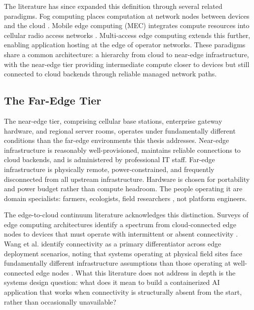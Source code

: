 The literature has since expanded this definition through several related paradigms. Fog computing places computation at network nodes between devices and the cloud \cite{bonomi2012fog, shi2016edge}. Mobile edge computing (MEC) integrates compute resources into cellular radio access networks \cite{mao2017survey}. Multi-access edge computing extends this further, enabling application hosting at the edge of operator networks. These paradigms share a common architecture: a hierarchy from cloud to near-edge infrastructure, with the near-edge tier providing intermediate compute closer to devices but still connected to cloud backends through reliable managed network paths.

\subsection{The Far-Edge Tier}
\label{sec:far-edge}
The near-edge tier, comprising cellular base stations, enterprise gateway hardware, and regional server rooms, operates under fundamentally different conditions than the far-edge environments this thesis addresses. Near-edge infrastructure is reasonably well-provisioned, maintains reliable connections to cloud backends, and is administered by professional IT staff. Far-edge infrastructure is physically remote, power-constrained, and frequently disconnected from all upstream infrastructure\cite{satyanarayanan2013cloudlets}. Hardware is chosen for portability and power budget rather than compute headroom. The people operating it are domain specialists: farmers, ecologists, field researchers , not platform engineers.

The edge-to-cloud continuum literature acknowledges this distinction. Surveys of edge computing architectures identify a spectrum from cloud-connected edge nodes to devices that must operate with intermittent or absent connectivity \cite{moreschini2022cloud}. Wang et al. identify connectivity as a primary differentiator across edge deployment scenarios, noting that systems operating at physical field sites face fundamentally different infrastructure assumptions than those operating at well-connected edge nodes \cite{wang2023ondevice}. What this literature does not address in depth is the systems design question: what does it mean to build a containerized AI application that works when connectivity is structurally absent from the start, rather than occasionally unavailable?


